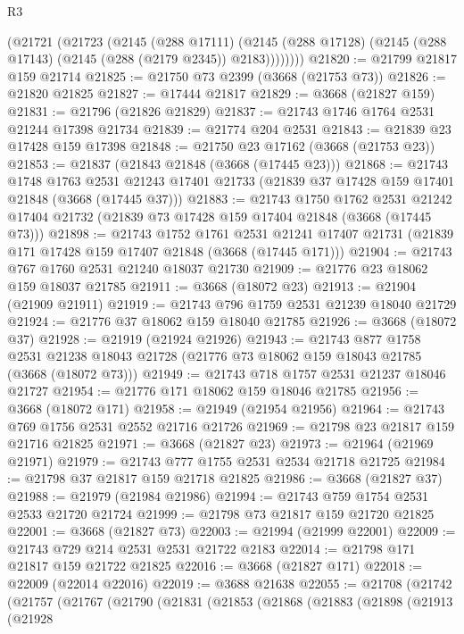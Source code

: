 \begin{lexlean}{R3}
\begin{coremodule}
        (@21721
          (@21723
            (@2145
              (@288 @17111)
              (@2145 (@288 @17128) (@2145 (@288 @17143) (@2145 (@288 (@2179 @2345)) @2183))))))))
@21820 := @21799 @21817 @159 @21714
@21825 := @21750 @73 @2399 (@3668 (@21753 @73))
@21826 := @21820 @21825
@21827 := @17444 @21817
@21829 := @3668 (@21827 @159)
@21831 := @21796 (@21826 @21829)
@21837 := @21743 @1746 @1764 @2531 @21244 @17398 @21734
@21839 := @21774 @204 @2531
@21843 := @21839 @23 @17428 @159 @17398
@21848 := @21750 @23 @17162 (@3668 (@21753 @23))
@21853 := @21837 (@21843 @21848 (@3668 (@17445 @23)))
@21868 := @21743
    @1748
    @1763
    @2531
    @21243
    @17401
    @21733
    (@21839 @37 @17428 @159 @17401 @21848 (@3668 (@17445 @37)))
@21883 := @21743
    @1750
    @1762
    @2531
    @21242
    @17404
    @21732
    (@21839 @73 @17428 @159 @17404 @21848 (@3668 (@17445 @73)))
@21898 := @21743
    @1752
    @1761
    @2531
    @21241
    @17407
    @21731
    (@21839 @171 @17428 @159 @17407 @21848 (@3668 (@17445 @171)))
@21904 := @21743 @767 @1760 @2531 @21240 @18037 @21730
@21909 := @21776 @23 @18062 @159 @18037 @21785
@21911 := @3668 (@18072 @23)
@21913 := @21904 (@21909 @21911)
@21919 := @21743 @796 @1759 @2531 @21239 @18040 @21729
@21924 := @21776 @37 @18062 @159 @18040 @21785
@21926 := @3668 (@18072 @37)
@21928 := @21919 (@21924 @21926)
@21943 := @21743
    @877
    @1758
    @2531
    @21238
    @18043
    @21728
    (@21776 @73 @18062 @159 @18043 @21785 (@3668 (@18072 @73)))
@21949 := @21743 @718 @1757 @2531 @21237 @18046 @21727
@21954 := @21776 @171 @18062 @159 @18046 @21785
@21956 := @3668 (@18072 @171)
@21958 := @21949 (@21954 @21956)
@21964 := @21743 @769 @1756 @2531 @2552 @21716 @21726
@21969 := @21798 @23 @21817 @159 @21716 @21825
@21971 := @3668 (@21827 @23)
@21973 := @21964 (@21969 @21971)
@21979 := @21743 @777 @1755 @2531 @2534 @21718 @21725
@21984 := @21798 @37 @21817 @159 @21718 @21825
@21986 := @3668 (@21827 @37)
@21988 := @21979 (@21984 @21986)
@21994 := @21743 @759 @1754 @2531 @2533 @21720 @21724
@21999 := @21798 @73 @21817 @159 @21720 @21825
@22001 := @3668 (@21827 @73)
@22003 := @21994 (@21999 @22001)
@22009 := @21743 @729 @214 @2531 @2531 @21722 @2183
@22014 := @21798 @171 @21817 @159 @21722 @21825
@22016 := @3668 (@21827 @171)
@22018 := @22009 (@22014 @22016)
@22019 := @3688 @21638
@22055 := @21708
    (@21742
      (@21757
        (@21767
          (@21790
            (@21831
              (@21853
                (@21868
                  (@21883
                    (@21898
                      (@21913
                        (@21928

\end{coremodule}
\end{lexlean}
